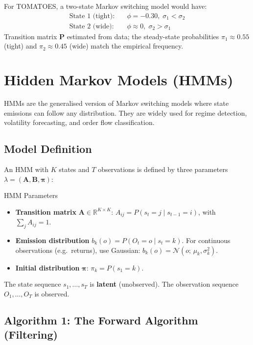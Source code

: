 \documentclass[12pt,a4paper,openany]{report}
\theoremstyle{definition}
\begin{document}
For TOMATOES, a two-state Markov switching model would have:
\begin{align}
  \text{State 1 (tight)}: \quad & \phi = -0.30, \; \sigma_1 < \sigma_2 \\
  \text{State 2 (wide)}: \quad  & \phi \approx 0, \; \sigma_2 > \sigma_1
\end{align}
Transition matrix $\mathbf{P}$ estimated from data; the steady-state probabilities $\pi_1 \approx 0.55$ (tight) and $\pi_2 \approx 0.45$ (wide) match the empirical frequency.

\section{Hidden Markov Models (HMMs)}

HMMs are the generalised version of Markov switching models where state emissions can follow any distribution. They are widely used for regime detection, volatility forecasting, and order flow classification.

\subsection{Model Definition}

An HMM with $K$ states and $T$ observations is defined by three parameters $\lambda = (\mathbf{A}, \mathbf{B}, \boldsymbol{\pi})$:

\begin{definitionbox}{HMM Parameters}
\begin{itemize}
  \item \textbf{Transition matrix} $\mathbf{A} \in \mathbb{R}^{K \times K}$: $A_{ij} = P(s_t = j \mid s_{t-1} = i)$, with $\sum_j A_{ij} = 1$.
  \item \textbf{Emission distribution} $b_k(o) = P(O_t = o \mid s_t = k)$. For continuous observations (e.g.\ returns), use Gaussian: $b_k(o) = \mathcal{N}(o;\, \mu_k, \sigma_k^2)$.
  \item \textbf{Initial distribution} $\boldsymbol{\pi}$: $\pi_k = P(s_1 = k)$.
\end{itemize}
The state sequence $s_1, \ldots, s_T$ is \textbf{latent} (unobserved). The observation sequence $O_1, \ldots, O_T$ is observed.
\end{definitionbox}

\subsection{Algorithm 1: The Forward Algorithm (Filtering)}
\end{document}
